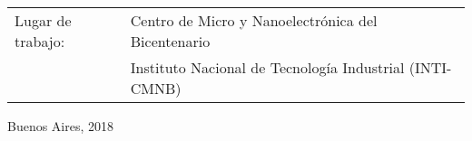 \begin{titlepage}
		\noindent\begin{tabular}{@{}ll}
		Lugar de trabajo: &Centro de Micro y Nanoelectrónica del Bicentenario \\
						  & Instituto Nacional de Tecnología Industrial (INTI-CMNB) \\ 
		\end{tabular} 
		\setlength\tabcolsep{6pt}

		\vspace*{\fill}
		
		\noindent\small{Buenos Aires, 2018}
	 	


\end{titlepage}